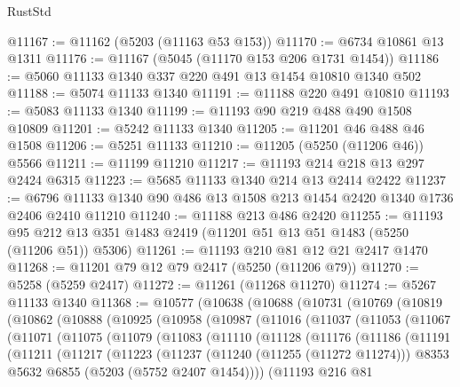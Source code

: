 \begin{lexlean}{RustStd}
\begin{coremodule}
@11167 := @11162 (@5203 (@11163 @53 @153))
@11170 := @6734 @10861 @13 @1311
@11176 := @11167 (@5045 (@11170 @153 @206 @1731 @1454))
@11186 := @5060 @11133 @1340 @337 @220 @491 @13 @1454 @10810 @1340 @502
@11188 := @5074 @11133 @1340
@11191 := @11188 @220 @491 @10810
@11193 := @5083 @11133 @1340
@11199 := @11193 @90 @219 @488 @490 @1508 @10809
@11201 := @5242 @11133 @1340
@11205 := @11201 @46 @488 @46 @1508
@11206 := @5251 @11133
@11210 := @11205 (@5250 (@11206 @46)) @5566
@11211 := @11199 @11210
@11217 := @11193 @214 @218 @13 @297 @2424 @6315
@11223 := @5685 @11133 @1340 @214 @13 @2414 @2422
@11237 := @6796 @11133 @1340 @90 @486 @13 @1508 @213 @1454 @2420 @1340 @1736 @2406 @2410 @11210
@11240 := @11188 @213 @486 @2420
@11255 := @11193 @95 @212 @13 @351 @1483 @2419 (@11201 @51 @13 @51 @1483 (@5250 (@11206 @51)) @5306)
@11261 := @11193 @210 @81 @12 @21 @2417 @1470
@11268 := @11201 @79 @12 @79 @2417 (@5250 (@11206 @79))
@11270 := @5258 (@5259 @2417)
@11272 := @11261 (@11268 @11270)
@11274 := @5267 @11133 @1340
@11368 := @10577
    (@10638
      (@10688
        (@10731
          (@10769
            (@10819
              (@10862
                (@10888
                  (@10925
                    (@10958
                      (@10987
                        (@11016
                          (@11037
                            (@11053
                              (@11067
                                (@11071
                                  (@11075
                                    (@11079
                                      (@11083
                                        (@11110
                                          (@11128
                                            (@11176
                                              (@11186
                                                (@11191
                                                  (@11211
                                                    (@11217
                                                      (@11223
                                                        (@11237
                                                          (@11240 (@11255 (@11272 @11274)))
                                                          @8353
                                                          @5632
                                                          @6855
                                                          (@5203 (@5752 @2407 @1454))))
                                                      (@11193
                                                        @216
                                                        @81

\end{coremodule}
\end{lexlean}
